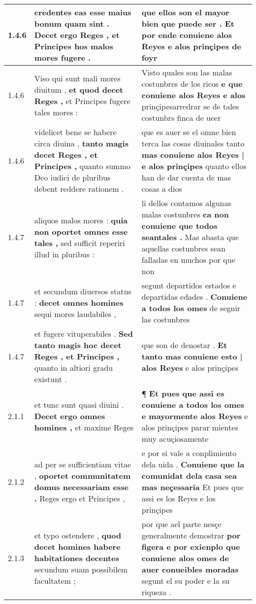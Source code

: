 \begin{tabular}{|p{1cm}|p{6.5cm}|p{6.5cm}|}
1.4.6 & credentes eas esse maius bonum quam sint . \textbf{ Decet ergo Reges , } et Principes hos malos mores fugere . & que ellos son el mayor bien que puede ser . \textbf{ Et por ende conuiene alos Reyes } e alos prinçipes de foyr \\\hline
1.4.6 & Viso qui sunt mali mores diuitum , \textbf{ et quod decet Reges , } et Principes fugere tales mores : & Visto quales son las malas costunbres de los ricos \textbf{ e que conuiene alos Reyes e alos } prinçipesarredrar se de tales costunbrs finca de ueer \\\hline
1.4.6 & videlicet bene se habere circa diuina , \textbf{ tanto magis decet Reges , et Principes , } quanto summo Deo iudici de pluribus debent reddere rationem . & que es auer se el omne bien terca las cosas diuinales tanto \textbf{ mas conuiene alos Reyes | e alos prinçipes } quanto ellos han de dar cuenta de mas cosas a dios \\\hline
1.4.7 & aliquos malos mores : \textbf{ quia non oportet omnes esse tales , } sed sufficit reperiri illud in pluribus : & li dellos contamos algunas malas costunbres \textbf{ ca non conuiene que todos seantales . } Mas abasta que aquellas costunbres sean falladas en muchos por que non \\\hline
1.4.7 & et secundum diuersos status : \textbf{ decet omnes homines } sequi mores laudabiles , & segunt departidos estados e departidas edades . \textbf{ Conuiene a todos los omes } de segnir las costunbres \\\hline
1.4.7 & et fugere vituperabiles . \textbf{ Sed tanto magis hoc decet Reges , et Principes , } quanto in altiori gradu existunt . & que son de denostar . \textbf{ Et tanto mas conuiene esto | alos Reyes } e alos prinçipes \\\hline
2.1.1 & et tunc sunt quasi diuini . \textbf{ Decet ergo omnes homines , } et maxime Reges & ¶ \textbf{ Et pues que assi es conuiene a todos los omes e mayormente alos Reyes } e alos prinçipes parar mientes muy acuçiosamente \\\hline
2.1.2 & ad per se sufficientiam vitae , \textbf{ oportet communitatem domus necessariam esse . } Reges ergo et Principes , & e por si vale a conplimiento dela uida . \textbf{ Conuiene que la comunidat dela casa sea mas neçessaria } Et pues que assi es los Reyes e los prinçipes \\\hline
2.1.3 & et typo ostendere , \textbf{ quod decet homines habere habitationes decentes } secundum suam possibilem facultatem ; & por que ael parte nesçe generalmente demostrar \textbf{ por figera e por exienplo que conuiene alos omes de auer conueibles moradas } segunt el su poder e la su riqueza . \\\hline

\end{tabular}
